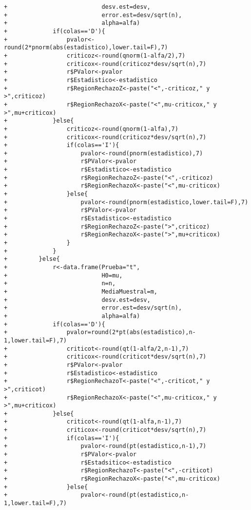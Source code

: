 \begin{solucion}
\begin{verbatim}
+                           desv.est=desv,
+                           error.est=desv/sqrt(n),
+                           alpha=alfa)
+             if(colas=='D'){
+                 pvalor<-round(2*pnorm(abs(estadistico),lower.tail=F),7)
+                 criticoz<-round(qnorm(1-alfa/2),7)
+                 criticox<-round(criticoz*desv/sqrt(n),7)
+                 r$PValor<-pvalor
+                 r$Estadistico<-estadistico
+                 r$RegionRechazoZ<-paste("<",-criticoz," y >",criticoz)
+                 r$RegionRechazoX<-paste("<",mu-criticox," y >",mu+criticox)
+             }else{
+                 criticoz<-round(qnorm(1-alfa),7)
+                 criticox<-round(criticoz*desv/sqrt(n),7)
+                 if(colas=='I'){
+                     pvalor<-round(pnorm(estadistico),7)
+                     r$PValor<-pvalor
+                     r$Estadistico<-estadistico
+                     r$RegionRechazoZ<-paste("<",-criticoz)
+                     r$RegionRechazoX<-paste("<",mu-criticox)
+                 }else{
+                     pvalor<-round(pnorm(estadistico,lower.tail=F),7)
+                     r$PValor<-pvalor
+                     r$Estadistico<-estadistico
+                     r$RegionRechazoZ<-paste(">",criticoz)
+                     r$RegionRechazoX<-paste(">",mu+criticox)
+                 }
+             }
+         }else{
+             r<-data.frame(Prueba="t",
+                           H0=mu,
+                           n=n,
+                           MediaMuestral=m,
+                           desv.est=desv,
+                           error.est=desv/sqrt(n),
+                           alpha=alfa)
+             if(colas=='D'){
+                 pvalor=round(2*pt(abs(estadistico),n-1,lower.tail=F),7)
+                 criticot<-round(qt(1-alfa/2,n-1),7)
+                 criticox<-round(criticot*desv/sqrt(n),7)
+                 r$PValor<-pvalor
+                 r$Estadistico<-estadistico
+                 r$RegionRechazoT<-paste("<",-criticot," y >",criticot)
+                 r$RegionRechazoX<-paste("<",mu-criticox," y >",mu+criticox)
+             }else{
+                 criticot<-round(qt(1-alfa,n-1),7)
+                 criticox<-round(criticot*desv/sqrt(n),7)
+                 if(colas=='I'){
+                     pvalor<-round(pt(estadistico,n-1),7)
+                     r$PValor<-pvalor
+                     r$Estadsitico<-estadistico
+                     r$RegionRechazoT<-paste("<",-criticot)
+                     r$RegionRechazoX<-paste("<",mu-criticox)
+                 }else{
+                     pvalor<-round(pt(estadistico,n-1,lower.tail=F),7)

\end{verbatim}
\end{solucion}
